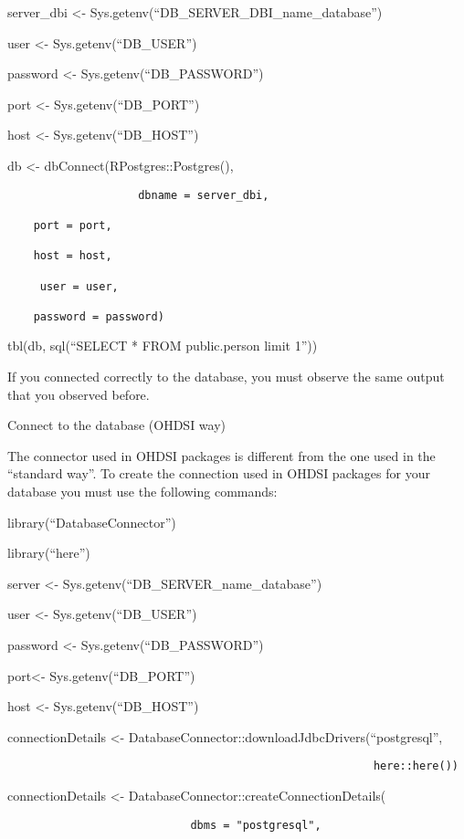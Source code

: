 \documentclass[
  letterpaper,
  DIV=11,
  numbers=noendperiod]{scrreprt}
\begin{document}
server\_dbi \textless- Sys.getenv(``DB\_SERVER\_DBI\_name\_database'')

user \textless- Sys.getenv(``DB\_USER'')

password \textless- Sys.getenv(``DB\_PASSWORD'')

port \textless- Sys.getenv(``DB\_PORT'')

host \textless- Sys.getenv(``DB\_HOST'')

db \textless- dbConnect(RPostgres::Postgres(),

\begin{verbatim}
                    dbname = server_dbi, 

    port = port, 

    host = host,

     user = user,

    password = password) 
\end{verbatim}

tbl(db, sql(``SELECT * FROM public.person limit 1''))

If you connected correctly to the database, you must observe the same
output that you observed before.

Connect to the database (OHDSI way)

The connector used in OHDSI packages is different from the one used in
the ``standard way''. To create the connection used in OHDSI packages
for your database you must use the following commands:

library(``DatabaseConnector'')

library(``here'')

server \textless- Sys.getenv(``DB\_SERVER\_name\_database'')

user \textless- Sys.getenv(``DB\_USER'')

password \textless- Sys.getenv(``DB\_PASSWORD'')

port\textless- Sys.getenv(``DB\_PORT'')

host \textless- Sys.getenv(``DB\_HOST'')

connectionDetails \textless-
DatabaseConnector::downloadJdbcDrivers(``postgresql'',

\begin{verbatim}
                                                        here::here()) 
\end{verbatim}

connectionDetails \textless- DatabaseConnector::createConnectionDetails(

\begin{verbatim}
                            dbms = "postgresql", 
\end{verbatim}
\end{document}
